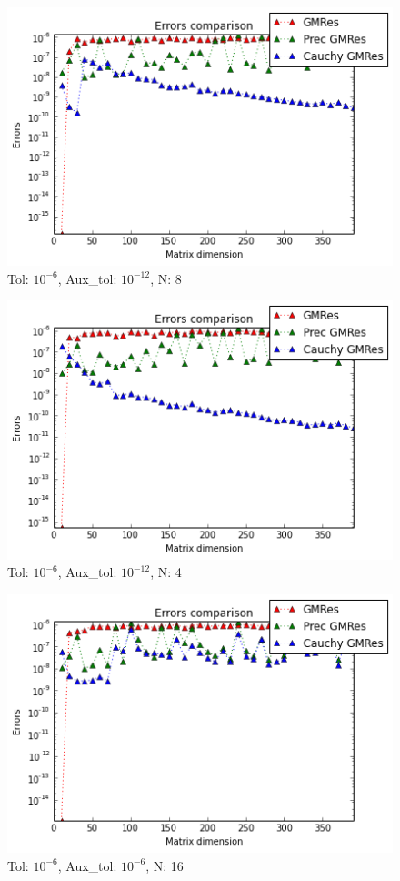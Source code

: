 \documentclass[fleqn]{article}
\begin{document}
\begin{figure}[ht]
    \centering
    \includegraphics[scale=0.4]{images/b4.png}
    \caption{Tol: $10^{-6}$, Aux\_tol: $10^{-12}$, N: 8}
    \label{fig:10}
\end{figure}
\newpage
\begin{figure}[ht]
    \centering
    \includegraphics[scale=0.4]{images/b5.png}
    \caption{Tol: $10^{-6}$, Aux\_tol: $10^{-12}$, N: 4}
    \label{fig:11}
\end{figure}

\begin{figure}[ht]
    \centering
    \includegraphics[scale=0.4]{images/b6.png}
    \caption{Tol: $10^{-6}$, Aux\_tol: $10^{-6}$, N: 16}
    \label{fig:12}
\end{figure}
\end{document}
